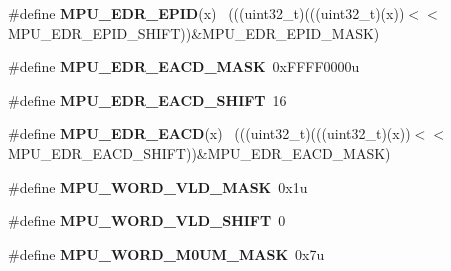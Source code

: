 \begin{DoxyCompactItemize}
\item 
\hypertarget{group___m_p_u___register___masks_ga5e4da7c3f4b78fca3badcd53b63680c1}{}\#define {\bfseries M\+P\+U\+\_\+\+E\+D\+R\+\_\+\+E\+P\+I\+D}(x)                                                ~(((uint32\+\_\+t)(((uint32\+\_\+t)(x))$<$$<$M\+P\+U\+\_\+\+E\+D\+R\+\_\+\+E\+P\+I\+D\+\_\+\+S\+H\+I\+F\+T))\&M\+P\+U\+\_\+\+E\+D\+R\+\_\+\+E\+P\+I\+D\+\_\+\+M\+A\+S\+K)\label{group___m_p_u___register___masks_ga5e4da7c3f4b78fca3badcd53b63680c1}

\item 
\hypertarget{group___m_p_u___register___masks_ga68e110ced075e97030f5c5a2f0cda968}{}\#define {\bfseries M\+P\+U\+\_\+\+E\+D\+R\+\_\+\+E\+A\+C\+D\+\_\+\+M\+A\+S\+K}~0x\+F\+F\+F\+F0000u\label{group___m_p_u___register___masks_ga68e110ced075e97030f5c5a2f0cda968}

\item 
\hypertarget{group___m_p_u___register___masks_gac82a810678a3390409319ea636e93d84}{}\#define {\bfseries M\+P\+U\+\_\+\+E\+D\+R\+\_\+\+E\+A\+C\+D\+\_\+\+S\+H\+I\+F\+T}~16\label{group___m_p_u___register___masks_gac82a810678a3390409319ea636e93d84}

\item 
\hypertarget{group___m_p_u___register___masks_ga9ce24407fd20ff7c01bbf20cd7ac483b}{}\#define {\bfseries M\+P\+U\+\_\+\+E\+D\+R\+\_\+\+E\+A\+C\+D}(x)                                                ~(((uint32\+\_\+t)(((uint32\+\_\+t)(x))$<$$<$M\+P\+U\+\_\+\+E\+D\+R\+\_\+\+E\+A\+C\+D\+\_\+\+S\+H\+I\+F\+T))\&M\+P\+U\+\_\+\+E\+D\+R\+\_\+\+E\+A\+C\+D\+\_\+\+M\+A\+S\+K)\label{group___m_p_u___register___masks_ga9ce24407fd20ff7c01bbf20cd7ac483b}

\item 
\hypertarget{group___m_p_u___register___masks_ga44e24e528550aa8ae4520965651fc1d9}{}\#define {\bfseries M\+P\+U\+\_\+\+W\+O\+R\+D\+\_\+\+V\+L\+D\+\_\+\+M\+A\+S\+K}~0x1u\label{group___m_p_u___register___masks_ga44e24e528550aa8ae4520965651fc1d9}

\item 
\hypertarget{group___m_p_u___register___masks_ga9b01ac6c738050f879b0d513ac37afbd}{}\#define {\bfseries M\+P\+U\+\_\+\+W\+O\+R\+D\+\_\+\+V\+L\+D\+\_\+\+S\+H\+I\+F\+T}~0\label{group___m_p_u___register___masks_ga9b01ac6c738050f879b0d513ac37afbd}

\item 
\hypertarget{group___m_p_u___register___masks_ga81c4b50e1693f2f64236771f4588ce0e}{}\#define {\bfseries M\+P\+U\+\_\+\+W\+O\+R\+D\+\_\+\+M0\+U\+M\+\_\+\+M\+A\+S\+K}~0x7u\label{group___m_p_u___register___masks_ga81c4b50e1693f2f64236771f4588ce0e}


\end{DoxyCompactItemize}
